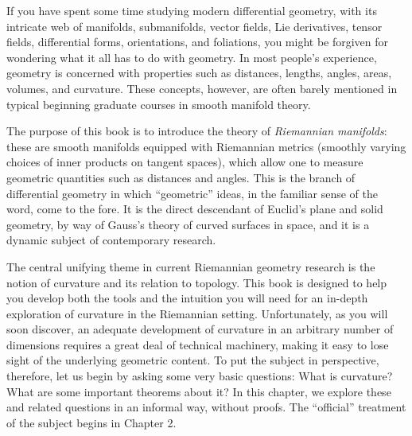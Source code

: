 
If you have spent some time studying modern differential geometry, with its intricate web of manifolds, submanifolds, vector fields, Lie derivatives, tensor fields, differential forms, orientations, and foliations, you might be forgiven for wondering what it all has to do with geometry. In most people's experience, geometry is concerned with properties such as distances, lengths, angles, areas, volumes, and curvature. These concepts, however, are often barely mentioned in typical beginning graduate courses in smooth manifold theory.

The purpose of this book is to introduce the theory of \emph{Riemannian manifolds}: these are smooth manifolds equipped with Riemannian metrics (smoothly varying choices of inner products on tangent spaces), which allow one to measure geometric quantities such as distances and angles. This is the branch of differential geometry in which ``geometric'' ideas, in the familiar sense of the word, come to the fore. It is the direct descendant of Euclid's plane and solid geometry, by way of Gauss's theory of curved surfaces in space, and it is a dynamic subject of contemporary research.

The central unifying theme in current Riemannian geometry research is the notion of curvature and its relation to topology. This book is designed to help you develop both the tools and the intuition you will need for an in-depth exploration of curvature in the Riemannian setting. Unfortunately, as you will soon discover, an adequate development of curvature in an arbitrary number of dimensions requires a great deal of technical machinery, making it easy to lose sight of the underlying geometric content. To put the subject in perspective, therefore, let us begin by asking some very basic questions: What is curvature? What are some important theorems about it? In this chapter, we explore these and related questions in an informal way, without proofs. The ``official'' treatment of the subject begins in Chapter 2.

